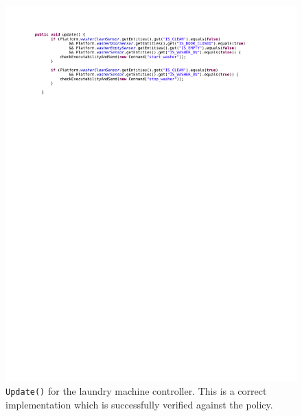 \documentclass{article}
\begin{document}
\begin{figure}[h]
\begin{center}
\includegraphics[scale=0.7, trim = 0 21.8cm 0 2.5cm]{code.pdf}
\caption{\texttt{Update()} for the laundry machine controller. This is a correct implementation which is successfully verified against the policy.}
\label{fig:code}
\end{center}
\end{figure}
\end{document}
